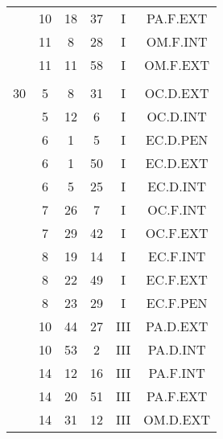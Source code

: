 \documentclass[12pt, a4paper]{article}
\begin{document}
\begin{multicols}{3}
{\begin{tabular}{c c c c c c}
	 	 	 	 & 10 & 18 & 37 & I & PA.F.EXT\\%
	 	 	 	 & 11 & 8 & 28 & I & OM.F.INT\\%
	 	 	 	 & 11 & 11 & 58 & I & OM.F.EXT\\%
	 	 	 	 & & & & & \\%
	 	 	 	30 & 5 & 8 & 31 & I & OC.D.EXT\\%
	 	 	 	 & 5 & 12 & 6 & I & OC.D.INT\\%
	 	 	 	 & 6 & 1 & 5 & I & EC.D.PEN\\%
	 	 	 	 & 6 & 1 & 50 & I & EC.D.EXT\\%
	 	 	 	 & 6 & 5 & 25 & I & EC.D.INT\\%
	 	 	 	 & 7 & 26 & 7 & I & OC.F.INT\\%
	 	 	 	 & 7 & 29 & 42 & I & OC.F.EXT\\%
	 	 	 	 & 8 & 19 & 14 & I & EC.F.INT\\%
	 	 	 	 & 8 & 22 & 49 & I & EC.F.EXT\\%
	 	 	 	 & 8 & 23 & 29 & I & EC.F.PEN\\%
	 	 	 	 & 10 & 44 & 27 & III & PA.D.EXT\\%
	 	 	 	 & 10 & 53 & 2 & III & PA.D.INT\\%
	 	 	 	 & 14 & 12 & 16 & III & PA.F.INT\\%
	 	 	 	 & 14 & 20 & 51 & III & PA.F.EXT\\%
	 	 	 	 & 14 & 31 & 12 & III & OM.D.EXT\\%
	 	 \end{tabular}
 	}
\end{multicols}
\end{document}
